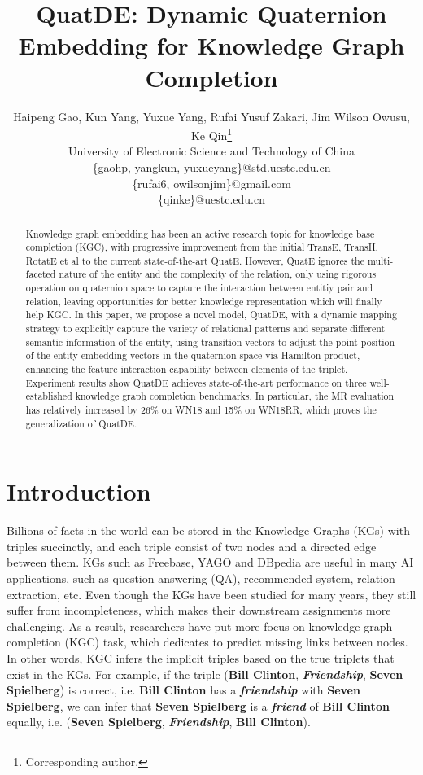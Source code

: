 \documentclass[letterpaper]{article} \usepackage{aaai20}  \usepackage{times}  \usepackage{helvet} \usepackage{courier}  \usepackage[hyphens]{url}  \usepackage{graphicx} \usepackage{lineno,hyperref,amsmath,amssymb}
\title{QuatDE: Dynamic Quaternion Embedding for Knowledge Graph Completion}
\author{Haipeng Gao, Kun Yang, Yuxue Yang, Rufai Yusuf Zakari, Jim Wilson Owusu, Ke Qin\thanks{Corresponding author.}\\
University of Electronic Science and Technology of China\\ 
\{gaohp, yangkun, yuxueyang\}@std.uestc.edu.cn\\
\{rufai6, owilsonjim\}@gmail.com\\
\{qinke\}@uestc.edu.cn
}
\begin{document}
\maketitle

\begin{abstract}
Knowledge graph embedding has been an active research topic for knowledge base completion (KGC), with progressive improvement from the initial TransE, TransH, RotatE et al to the current state-of-the-art QuatE. However, QuatE ignores the multi-faceted nature of the entity and the complexity of the relation, only using rigorous operation on quaternion space to capture the interaction between entitiy pair and relation, leaving opportunities for better knowledge representation which will finally help KGC. In this paper, we propose a novel model, QuatDE, with a dynamic mapping strategy to explicitly capture the variety of relational patterns and separate different semantic information of the entity, using transition vectors to adjust the point position of the entity embedding vectors in the quaternion space via Hamilton product, enhancing the feature interaction capability between elements of the triplet.  Experiment results show QuatDE achieves state-of-the-art performance on three well-established knowledge graph completion benchmarks. In particular, the MR evaluation has relatively increased by 26\% on WN18 and 15\% on WN18RR, which proves the generalization of QuatDE.
\end{abstract}


\section{Introduction}

Billions of facts in the world can be stored in the Knowledge Graphs (KGs) with triples succinctly, and each triple  consist of two nodes and a directed edge between them. KGs such as Freebase\cite{bollacker2008freebase}, YAGO\cite{suchanek2007yago} and DBpedia\cite{lehmann2015dbpedia} are useful in many AI applications, such as question answering (QA)\cite{cui2019kbqa}, recommended system\cite{wang2018dkn}, relation extraction\cite{wang2020direction}, etc. Even though the KGs have been studied for many years, they still suffer from incompleteness, which makes their downstream assignments more challenging. As a result, researchers have put more focus on knowledge graph completion (KGC) task, which dedicates to predict missing links between nodes. In other words, KGC infers the implicit triples based on the true triplets that exist in the KGs. For example, if the triple (\textbf{Bill Clinton}, \textbf{\textit{Friendship}}, \textbf{Seven Spielberg}) is correct, i.e. \textbf{Bill Clinton} has a \textbf{\textit{friendship}} with \textbf{Seven Spielberg}, we can infer that \textbf{Seven Spielberg} is a \textbf{\textit{friend}} of \textbf{Bill Clinton} equally, i.e. (\textbf{Seven Spielberg}, \textbf{\textit{Friendship}}, \textbf{Bill Clinton}).
\end{document}
